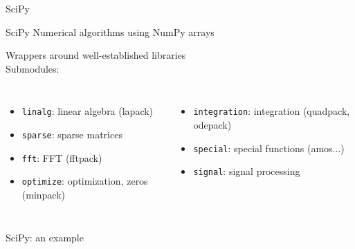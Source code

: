 \begin{frame}{SciPy}

\begin{exbox}{SciPy}
Numerical algorithms using NumPy arrays
\end{exbox}

Wrappers around well-established libraries\\[1.0ex]

Submodules:

\begin{columns}


\begin{itemize}
    \item {\texttt{linalg}}: linear algebra (lapack)
    \item{\texttt{sparse}}: sparse matrices
    \item {\texttt{fft}}: FFT (fftpack)
    \item {\texttt{optimize}}: optimization, zeros (minpack)
\end{itemize}



\begin{itemize}
    \item {\texttt{integration}}: integration (quadpack, odepack)
    \item {\texttt{special}}: special functions (amos...)
    \item {\texttt{signal}}: signal processing
\end{itemize}

\end{columns}

\end{frame}

\begin{frame}[fragile]{SciPy: an example}



\end{frame}

